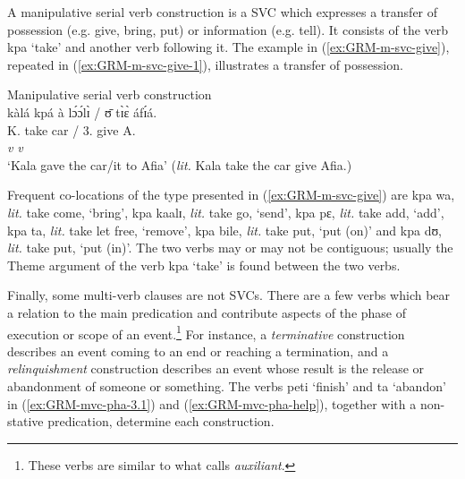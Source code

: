 \ea\label{ex:GRM-mvc-3-4}



\z 
 \z

A  manipulative serial verb construction \citep[378]{Amek06} is a SVC
which  expresses a transfer of possession (e.g. give, bring, put)  or  
information (e.g. tell). It consists of the verb {\sls kpa} `take' and another
verb following it. The example in (\ref{ex:GRM-m-svc-give}), repeated in 
(\ref{ex:GRM-m-svc-give-1}), 
illustrates a transfer of possession. 

\begin{exe}

\ex\label{ex:GRM-m-svc-give-1}{\rm Manipulative serial verb construction}\\
\glll  kàlá kpá  {à lɔ́ɔ́lɪ̀ / ʊ̄} tɪ̀ɛ̀ áfɪ́á.\\
K. take  {{\art} car / 3.\sg} give A.\\
{} {\it v} {}  {\it v} {}\\
\glt  `Kala gave the car/it to Afia' ({\it lit.} Kala take the car give Afia.)
 
\end{exe}


Frequent co-locations of the type presented in (\ref{ex:GRM-m-svc-give}) are 
{\sls kpa wa}, {\it lit.}  take come,  `bring',  {\sls kpa kaalɪ}, {\it lit.} 
take 
go,
`send', {\sls kpa pɛ}, {\it lit.} take add,  `add', {\sls kpa ta}, {\it lit.} 
take
let free, `remove', {\sls kpa bile}, {\it lit.} take put,  `put (on)'  and 
{\sls 
kpa
dʊ}, {\it lit.} take put,  `put (in)'. The two verbs may or may not be
contiguous;  usually the Theme argument of the  verb {\sls kpa} `take'  is found
between the two verbs.






Finally, some multi-verb clauses are not  SVCs.  There are a few verbs
which
bear a
relation to the main predication and  contribute  aspects of the phase of
execution or scope of an event.\footnote{These verbs are similar 
to what \citet[108]{Bonv88}
calls {\it auxiliant}.} For instance, a {\it
terminative}  construction describes an event coming to an end or reaching a
termination, and  a {\it relinquishment} construction describes an event whose
result is the release or abandonment of someone or something.  The verbs {\sls 
peti}
`finish' and {\sls ta} `abandon' in (\ref{ex:GRM-mvc-pha-3.1}) and
(\ref{ex:GRM-mvc-pha-help}), together with a non-stative predication, determine
each construction. 



